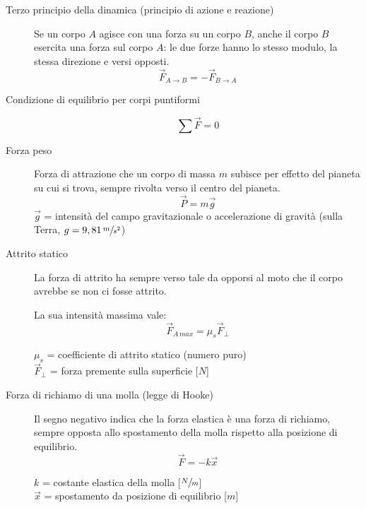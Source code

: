 \documentclass[a4paper,11pt,italian]{article}
\begin{document}
\begin{description}
  \item[Terzo principio della dinamica (principio di azione e reazione)] 
  Se un corpo $ A $ agisce con una forza su un corpo $ B $, anche il corpo $ B $ esercita una forza sul corpo $ A $: le due forze hanno lo stesso modulo, la stessa direzione e versi opposti.
  \[ \vec{F}_{A \rightarrow B} = - \vec{F}_{B \rightarrow A}\]
  
  \item[Condizione di equilibrio per corpi puntiformi]
  \[ \sum\vec{F} = 0 \]
  
  \item[Forza peso] 
  Forza di attrazione che un corpo di massa $ m $ subisce per effetto del pianeta su cui si trova, sempre rivolta verso il centro del pianeta.
  \[ \vec{P} = m \vec{g} \]
  $ \vec{g} $ = intensità del campo gravitazionale o accelerazione di gravità (sulla Terra, $ g=9,81 \, \sfrac{m}{s^2} $)
  
  \item[Attrito statico] 
  La forza di attrito ha sempre verso tale da opporsi al moto che il corpo avrebbe se non ci fosse attrito.
  
  La sua intensità massima vale:
  \[ \vec{F}_{A \, max} = \mu_s \vec{F}_\perp  \]
  \begin{multicols}{2}
  $ \mu_s $ = coefficiente di attrito statico (numero puro)\\
  $ \vec{F}_\perp $ = forza premente sulla superficie [$ N $]
  \end{multicols}
  
  \item[Forza di richiamo di una molla (legge di Hooke)]
  Il segno negativo indica che la forza elastica è una forza di richiamo, sempre opposta allo spostamento della molla rispetto alla posizione di equilibrio.
  \[ \vec{F} = - k \vec{x} \]
  \begin{multicols}{2}
  $ k $ = costante elastica della molla [$ \sfrac{N}{m} $]\\
  $ \vec{x} $ = spostamento da posizione di equilibrio [$ m $]
  \end{multicols}

\end{description}
\end{document}
